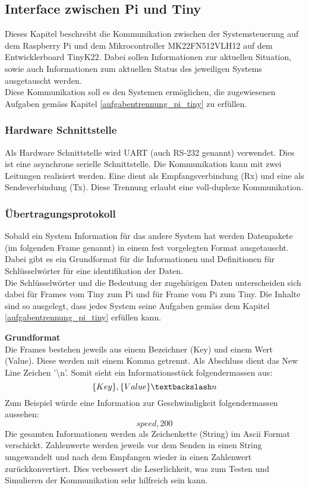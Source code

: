 \documentclass[../../main.tex]{subfiles}
\begin{document}
    \subsection{Interface zwischen Pi und Tiny} \label{interface_pi_tiny}
    Dieses Kapitel beschreibt die Kommunikation zwischen der Systemsteuerung auf dem Raspberry Pi und dem Mikrocontroller MK22FN512VLH12 auf dem Entwicklerboard TinyK22. Dabei sollen Informationen zur aktuellen Situation, sowie auch Informationen zum aktuellen Status des jeweiligen Systems ausgetauscht werden.\\
    Diese Kommunikation soll es den Systemen ermöglichen, die zugewiesenen Aufgaben gemäss Kapitel \ref{aufgabentrennung_pi_tiny} zu erfüllen.

    \subsubsection{Hardware Schnittstelle}
    Als Hardware Schnittstelle wird UART (auch RS-232 genannt) verwendet. Dies ist eine asynchrone serielle Schnittstelle. Die Kommunikation kann mit zwei Leitungen realisiert werden. Eine dient als Empfangsverbindung (Rx) und eine als Sendeverbindung (Tx). Diese Trennung erlaubt eine voll-duplexe Kommunikation.

    \subsubsection{Übertragungsprotokoll}
    Sobald ein System Information für das andere System hat werden Datenpakete (im folgenden Frame genannt) in einem fest vorgelegten Format ausgetauscht. Dabei gibt es ein Grundformat für die Informationen und Definitionen für Schlüsselwörter für eine identifikation der Daten.\\
    Die Schlüsselwörter und die Bedeutung der zugehörigen Daten unterscheiden sich dabei für Frames vom Tiny zum Pi und für Frame vom Pi zum Tiny. Die Inhalte sind so ausgelegt, dass jedes System seine Aufgaben gemäss dem Kapitel \ref{aufgabentrennung_pi_tiny} erfüllen kann.

    \textbf{Grundformat}\\
    Die Frames bestehen jeweils aus einem Bezeichner (Key) und einem Wert (Value). Diese werden mit einem Komma getrennt. Als Abschluss dient das New Line Zeichen '\textbackslash n'. Somit sieht ein Informationsstück folgendermassen aus: $$\{Key\},\{Value\}\textbackslash n$$
    Zum Beispiel würde eine Information zur Geschwindigkeit folgendermassen aussehen: $$speed,200$$
    Die gesamten Informationen werden als Zeichenkette (String) im Ascii Format verschickt. Zahlenwerte werden jeweils vor dem Senden in einen String umgewandelt und nach dem Empfangen wieder in einen Zahlenwert zurückkonvertiert. Dies verbessert die Leserlichkeit, was zum Testen und Simulieren der Kommunikation sehr hilfreich sein kann.
\end{document}
